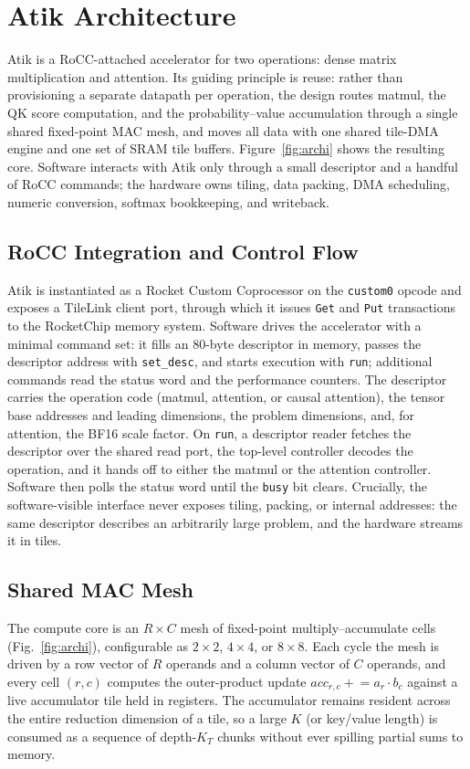 \documentclass[sigconf,nonacm]{acmart}
\begin{document}
\section{Atik Architecture}

Atik is a RoCC-attached accelerator for two operations: dense matrix
multiplication and attention. Its guiding principle is reuse: rather than
provisioning a separate datapath per operation, the design routes matmul, the
QK score computation, and the probability--value accumulation through a
single shared fixed-point MAC mesh, and moves all data with one shared tile-DMA
engine and one set of SRAM tile buffers. Figure~\ref{fig:archi} shows the
resulting core. Software interacts with Atik only through a small descriptor
and a handful of RoCC commands; the hardware owns tiling, data packing, DMA
scheduling, numeric conversion, softmax bookkeeping, and writeback.

\subsection{RoCC Integration and Control Flow}
Atik is instantiated as a Rocket Custom Coprocessor on the \texttt{custom0}
opcode and exposes a TileLink client port, through which it issues
\texttt{Get} and \texttt{Put} transactions to the RocketChip memory system.
Software drives the
accelerator with a minimal command set: it fills an 80-byte descriptor in
memory, passes the descriptor address with \texttt{set\_desc}, and starts
execution with \texttt{run}; additional commands read the status word and the
performance counters. The descriptor carries the operation code
(matmul, attention, or causal attention), the tensor base addresses and leading
dimensions, the problem dimensions, and, for attention, the BF16 scale factor.
On \texttt{run}, a descriptor reader fetches the descriptor over the shared read
port, the top-level controller decodes the operation, and it hands off to either
the matmul or the attention controller. Software then polls the status word
until the \texttt{busy} bit clears. Crucially, the software-visible interface
never exposes tiling, packing, or internal addresses: the same descriptor
describes an arbitrarily large problem, and the hardware streams it in tiles.

\subsection{Shared MAC Mesh}
\label{sec:sharedmesh}
The compute core is an $R\times C$ mesh of fixed-point multiply--accumulate
cells (Fig.~\ref{fig:archi}), configurable as $2\times2$, $4\times4$, or
$8\times8$. Each cycle the mesh is driven by a row vector of $R$ operands and a
column vector of $C$ operands, and every cell $(r,c)$ computes the outer-product
update $\mathit{acc}_{r,c} \mathrel{+}= a_r \cdot b_c$ against a live
accumulator tile held in registers. The accumulator remains resident across the
entire reduction dimension of a tile, so a large $K$ (or key/value length) is
consumed as a sequence of depth-$K_T$ chunks without ever spilling partial
sums to memory.
\end{document}
